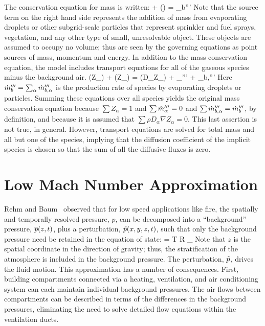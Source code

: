 The conservation equation for mass is written:
\be {} + \nabla\!\cdot (\rho \bu)  =  \dm_b'''  \label{mass} \ee
Note that the source term on the right hand side represents the addition of mass from evaporating droplets or other subgrid-scale
particles that represent sprinkler and fuel sprays, vegetation, and any other type of small, unresolvable object. These
objects are assumed to occupy no volume; thus are seen by the governing equations as point sources of mass, momentum and energy.
In addition to the mass conservation equation, the model includes transport equations for all of the gaseous species minus the
background air.
\be {}(\rho Z_\alpha) + \nabla\!\cdot (\rho Z_\alpha \bu) = \nabla\!\cdot (\rho D_\alpha \nabla Z_\alpha) + \dm_\alpha''' + \dm_{b,\alpha}''' \label{species} \ee
Here $\dot{m}_b'''=\sum_\alpha \dot{m}_{b,\alpha}'''$ is the production rate of species by evaporating droplets or particles.
Summing these equations over all species yields the original mass conservation equation because
$\sum Z_\alpha=1$ and $\sum \dot{m}_\alpha''' = 0$ and $\sum \dot{m}_{b,\alpha}'''=\dot{m}_b'''$, by definition, and because it is assumed
that $\sum \rho D_\alpha \nabla Z_\alpha = 0$. This last assertion is not true, in general.
However, transport equations are solved for total
mass and all but one of the species, implying that the diffusion coefficient of the implicit species is
chosen so that the sum of all the diffusive fluxes is zero.

\section{Low Mach Number Approximation}

Rehm and Baum~\cite{Rehm:1} observed that for low speed applications like fire, the
spatially and temporally resolved pressure, $p$, can be decomposed into a ``background'' pressure,
$\overline{p}(z,t)$, plus a perturbation, $\tilde{p}(x,y,z,t)$, such that only the background pressure need be retained in the
equation of state:
\be \bp = \rho T {\cal R} \sum_\alpha  {} \equiv {}  \label{basicstate1} \ee
Note that $z$ is the spatial coordinate in the direction of gravity; thus, the stratification of the atmosphere is included in
the background pressure. The perturbation, $\tilde{p}$, drives the fluid motion.
This approximation has a number of consequences. First, building compartments connected via a heating, ventilation, and air
conditioning system can each maintain individual background pressures. The air flows between compartments can be
described in terms of the differences in the background pressures, eliminating the need to solve detailed flow
equations within the ventilation ducts.

